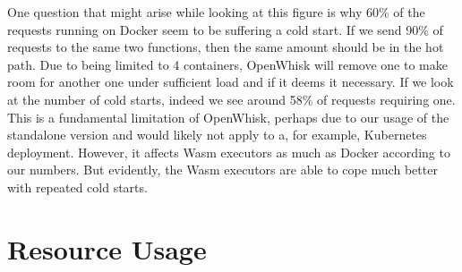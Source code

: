 
One question that might arise while looking at this figure is why 60\% of the requests running on Docker seem to be suffering a cold start. If we send 90\% of requests to the same two functions, then the same amount should be in the hot path. Due to being limited to 4 containers, OpenWhisk will remove one to make room for another one under sufficient load and if it deems it necessary. If we look at the number of cold starts, indeed we see around 58\% of requests requiring one. This is a fundamental limitation of OpenWhisk, perhaps due to our usage of the standalone version and would likely not apply to a, for example, Kubernetes deployment. However, it affects Wasm executors as much as Docker according to our numbers. But evidently, the Wasm executors are able to cope much better with repeated cold starts.



\section{Resource Usage}

